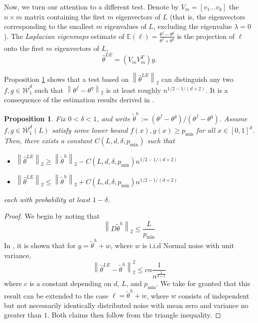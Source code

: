 \documentclass{article}
\newcommand{\norm}[1]{\left\lVert#1\right\rVert}
\newcommand{\1}{\mathbb{I}}
\newcommand{\Ebb}{\mathbb{E}}
\theoremstyle{alden}
\theoremstyle{aldenthm}
\newtheorem{proposition}{Proposition}
\theoremstyle{definition}
\theoremstyle{remark}
\begin{document}
Now, we turn our attention to a different test. Denote by $V_m = [v_1 \ldots v_k]$ the $n \times m$ matrix containing the first $m$ eigenvectors of $L$ (that is, the eigenvectors corresponding to the smallest $m$ eigenvalues of $L$, excluding the eigenvalue $\lambda = 0$). The \emph{Laplacian eigenmaps} estimate of $\Ebb(\ell) = \frac{\theta^f - \theta^g}{\theta^f + \theta^g}$ is the projection of $\ell$ onto the first $m$ eigenvectors of $L$, 
\begin{equation*}
\widehat{\theta}^{LE} = (V_m V_m^T) y.
\end{equation*}

Proposition \ref{prop: k_eigenvector_test} shows that a test based on $\norm{\widehat{\theta}^{LE}}_2$ can distinguish any two $f,g \in \overline{\mathcal{W}}_1^d$ such that $\norm{\theta^f - \theta^g}_2$ is at least roughly $n^{1/2 - 1/(d + 2)}$. It is a consequence of the estimation results derived in \cite{sadhanala2016}.

\begin{proposition}
	\label{prop: k_eigenvector_test}
	Fix $0 < \delta < 1$, and write $\widetilde{\theta}^h := (\theta^f - \theta^g)/(\theta^f - \theta^g)$. Assume $f,g \in \overline{\mathcal{W}}_1^d(L)$ satisfy some lower bound $f(x), g(x) \geq p_{\min}$ for all $x \in [0,1]^d$. Then, there exists a constant $C(L, d,\delta,p_{\min})$ such that
	\begin{itemize}
		\item $\norm{\widehat{\theta}^{LE}}_2 \geq \norm{\widetilde{\theta}^h}_2 -  C(L, d,\delta, p_{\min})n^{1/2 -1/(d + 2)}$
		\item $\norm{\widehat{\theta}^{LE}}_2 \leq \norm{\widetilde{\theta}^h}_2 +  C(L, d,\delta, p_{\min})n^{1/2 -1/(d + 2)}$
	\end{itemize}
	each with probability at least $1 - \delta$.
\end{proposition}
\begin{proof}
	We begin by noting that
	\begin{equation*}
	\norm{D \widetilde{\theta}^h}_2 \leq \frac{L}{p_{\min}}
	\end{equation*}
	In \cite{sadhanala2016}, it is shown that for $y = \widetilde{\theta}^h + w$, where $w$ is i.i.d Normal noise with unit variance,
	\begin{equation*}
	\norm{\widehat{\theta}^{LE} - \widetilde{\theta}^h}_2^2 \leq c n \frac{1}{n^{\frac{2}{d+2}}}
	\end{equation*}
	where $c$ is a constant depending on $d$, $L$, and $p_{\min}$. We take for granted that this result can be extended to the case $\ell = \widetilde{\theta}^h + w$, where $w$ consists of independent but not necessarily identically distributed noise with mean zero and variance no greater than $1$. Both claims then follow from the triangle inequality.
\end{proof}



\clearpage


\end{document}
